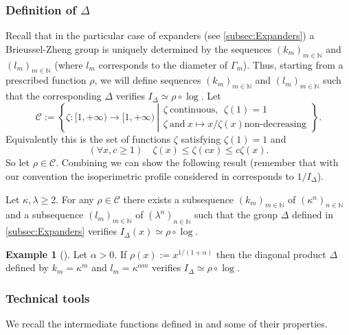 \documentclass[english, 11pt, a4paper]{article}
\theoremstyle{definition}
\newtheorem{Ex}[Def]{Example}
\numberwithin{equation}{section}
\newcommand{\bN}{\mathbb{N}}
\newcommand{\calC}{\mathcal{C}}
\newcommand{\Gs}{\Gamma_m}
\newcommand{\BZ}{\Delta}
\newcommand{\profile}{I}
\begin{document}
\subsubsection{\texorpdfstring{Definition of $\Delta$}{Definition of the
    diagonal product}}
Recall that in the particular case of expanders (see \cref{subsec:Expanders}) a
Brieussel-Zheng group is uniquely determined by the sequences
$(k_m)_{m\in \bN}$ and $(l_m)_{m\in \bN}$ (where $l_m$ corresponds to the
diameter of $\Gs$).
Thus, starting from a prescribed function $\rho$, we will define sequences
$(k_m)_{m\in \bN}$ and $(l_m)_{m\in \bN}$ such that the corresponding $\BZ$ 
verifies $\profile_{\BZ} \simeq \rho \circ \log$. %
Let
\begin{equation*}
  \calC:=\left\{ \zeta :[1,+\infty) \rightarrow [1,+\infty) \ \left\vert
    \begin{matrix}
      \zeta \ \text{continuous}, \ \ \zeta(1)=1 \\
      \zeta \ \text{and} \ x\mapsto x/\zeta(x) \text{non-decreasing}
    \end{matrix} \right.
  \right\}.
\end{equation*}
Equivalently this is the set of functions $\zeta$ satisfying $\zeta(1)=1$ and
\begin{equation}
  \label{Rq:IneqTildeRho}
 \left( \forall x,c\geq 1 \right) \quad \zeta(x)\leq \zeta(cx) \leq c\zeta(x).  
\end{equation}
So let $\rho \in \calC$. 
Combining \cite[Proposition B.2 and
Theorem 4.6]{BZ} we can show the following result (remember that with our
convention the isoperimetric profile considered in \cite{BZ} corresponds to
$1/I_{\BZ}$).

\begin{Prop}\label{Prop:DefdeDelta}
  Let $\kappa, \lambda \geq 2$. For any $\rho \in \calC$ there exists a
  subsequence $(k_m)_{m\in \bN}$ of $(\kappa^n)_{n\in \bN}$ and a subsequence
  $(l_m)_{m\in \bN}$ of $(\lambda^n)_{n\in \bN}$ such that the group $\BZ$ defined in
  \cref{subsec:Expanders} verifies $\profile_{\BZ}(x) \simeq \rho \circ \log$.
\end{Prop}

\begin{Ex}[{\cite[Example 4.5]{BZ}}]\label{Ex:Alpha} Let $\alpha >0$. If
  $\rho(x):=x^{1/(1+\alpha)}$ then the diagonal 
  product $\BZ$ defined by $k_m=\kappa^m$ and $l_m=\kappa^{\alpha m}$ verifies
  $I_{\BZ}\simeq \rho \circ \log$. 
\end{Ex}
\subsubsection{Technical tools} 
We recall the intermediate functions
defined in \cite[Appendix B]{BZ} and some of their properties.
\end{document}
